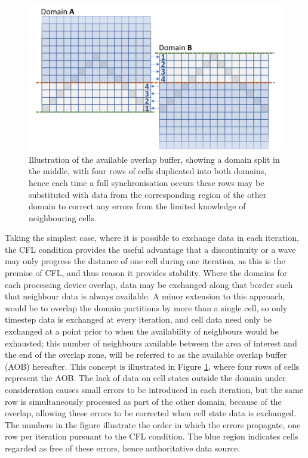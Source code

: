 \begin{figure}[tpb]
	\centering
	\includegraphics[width=1.0\textwidth]{decomposition-test-figures/aob.png}
	\caption{Illustration of the available overlap buffer, showing a domain split in the middle, with four rows of cells duplicated into both domains, hence each time a full synchronisation occurs these rows may be substituted with data from the corresponding region of the other domain to correct any errors from the limited knowledge of neighbouring cells.}
	\label{AOB_Description}
\end{figure}

Taking the simplest case, where it is possible to exchange data in each iteration, the CFL condition provides the useful advantage that a discontinuity or a wave may only progress the distance of one cell during one iteration, as this is the premise of CFL, and thus reason it provides stability. Where the domains for each processing device overlap, data may be exchanged along that border such that neighbour data is always available. A minor extension to this approach, would be to overlap the domain partitions by more than a single cell, so only timestep data is exchanged at every iteration, and cell data need only be exchanged at a point prior to when the availability of neighbours would be exhausted; this number of neighbours available between the area of interest and the end of the overlap zone, will be referred to as the available overlap buffer (AOB) hereafter. This concept is illustrated in Figure \ref{AOB_Description}, where four rows of cells represent the AOB. The lack of data on cell states outside the domain under consideration causes small errors to be introduced in each iteration, but the same row is simultaneously processed as part of the other domain, because of the overlap, allowing these errors to be corrected when cell state data is exchanged. The numbers in the figure illustrate the order in which the errors propagate, one row per iteration pursuant to the CFL condition. The blue region indicates cells regarded as free of these errors, hence authoritative data source.

